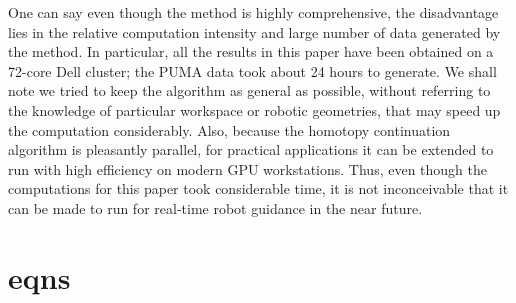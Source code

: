 \documentclass[12pt]{report}
\begin{document}
One can say even though the method is highly comprehensive,  the disadvantage lies in the relative computation intensity and large number of data generated by the method. 
In particular, all the results in this paper have been obtained on a 72-core Dell cluster; the PUMA data took about 24 hours to generate. We shall note we tried to keep the algorithm as general as possible, without referring to the knowledge of particular workspace or robotic geometries, that may speed up the computation considerably. Also,  because the homotopy continuation algorithm is pleasantly parallel, for practical applications it can be extended to run with high efficiency on modern GPU workstations. Thus, even though the computations for this paper took considerable time, it is not inconceivable that it can be made to run for real-time robot guidance in the near future. 





%

\newpage
\section{eqns}
\end{document}
